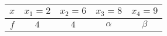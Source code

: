 \begin{tabular}{|c|c|c|c|c|}
\hline
$x$ & $x_1 = 2$ & $x_2 = 6$ & $x_3 = 8$ & $x_4 = 9$ \\
\hline
$f$ & $4$ & $4$ & $\alpha$ & $\beta$ \\
\hline
\end{tabular}


